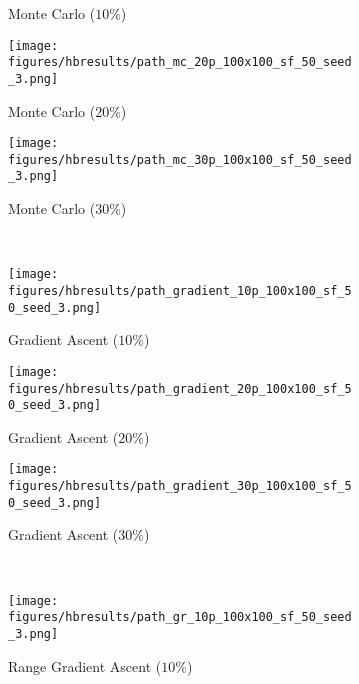 \begin{figure}[htb!]
\begin{subfigure}[t]{0.32\textwidth}
        \ssp
        \captionsetup{skip=0.20\baselineskip,size=footnotesize}
        \caption{Monte Carlo ($10\%$)}
    \end{subfigure}%
    \begin{subfigure}[t]{0.32\textwidth}
        \centering
        \texttt{[image: figures/hbresults/path\_mc\_20p\_100x100\_sf\_50\_seed\_3.png]}
        \ssp
        \captionsetup{skip=0.20\baselineskip,size=footnotesize}
        \caption{Monte Carlo ($20\%$)}
    \end{subfigure}%
    \begin{subfigure}[t]{0.32\textwidth}
        \centering
        \texttt{[image: figures/hbresults/path\_mc\_30p\_100x100\_sf\_50\_seed\_3.png]}
        \ssp
        \captionsetup{skip=0.20\baselineskip,size=footnotesize}
        \caption{Monte Carlo ($30\%$)}
    \end{subfigure}%
    \\
    \begin{subfigure}[t]{0.32\textwidth}
        \centering
        \texttt{[image: figures/hbresults/path\_gradient\_10p\_100x100\_sf\_50\_seed\_3.png]}
        \ssp
        \captionsetup{skip=0.20\baselineskip,size=footnotesize}
        \caption{Gradient Ascent ($10\%$)}
    \end{subfigure}%
    \begin{subfigure}[t]{0.32\textwidth}
        \centering
        \texttt{[image: figures/hbresults/path\_gradient\_20p\_100x100\_sf\_50\_seed\_3.png]}
        \ssp
        \captionsetup{skip=0.20\baselineskip,size=footnotesize}
        \caption{Gradient Ascent ($20\%$)}
    \end{subfigure}%
    \begin{subfigure}[t]{0.32\textwidth}
        \centering
        \texttt{[image: figures/hbresults/path\_gradient\_30p\_100x100\_sf\_50\_seed\_3.png]}
        \ssp
        \captionsetup{skip=0.20\baselineskip,size=footnotesize}
        \caption{Gradient Ascent ($30\%$)}
    \end{subfigure}%
    \\
    \begin{subfigure}[t]{0.32\textwidth}
        \centering
        \texttt{[image: figures/hbresults/path\_gr\_10p\_100x100\_sf\_50\_seed\_3.png]}
        \ssp
        \captionsetup{skip=0.20\baselineskip,size=footnotesize}
        \caption{Range Gradient Ascent ($10\%$)}
    \end{subfigure}%
    \begin{subfigure}[t]{0.32\textwidth}

\end{subfigure}
\end{figure}
